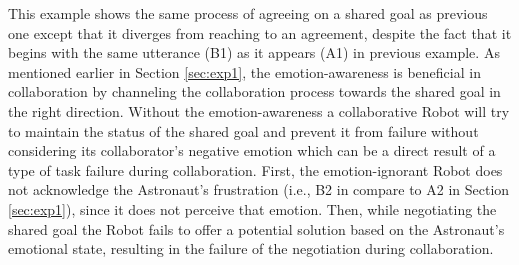 This example shows the same process of agreeing on a shared goal as previous
one except that it diverges from reaching to an agreement, despite the fact
that it begins with the same utterance (B1) as it appears (A1) in previous
example. As mentioned earlier in Section \ref{sec:exp1}, the emotion-awareness
is beneficial in collaboration by channeling the collaboration process towards
the shared goal in the right direction. Without the emotion-awareness a
collaborative Robot will try to maintain the status of the shared goal and
prevent it from failure without considering its collaborator's negative emotion
which can be a direct result of a type of task failure during collaboration.
First, the emotion-ignorant Robot does not acknowledge the Astronaut's
frustration (i.e., B2 in compare to A2 in Section \ref{sec:exp1}), since it does
not perceive that emotion. Then, while negotiating the shared goal the Robot
fails to offer a potential solution based on the Astronaut's emotional state,
resulting in the failure of the negotiation during collaboration.

